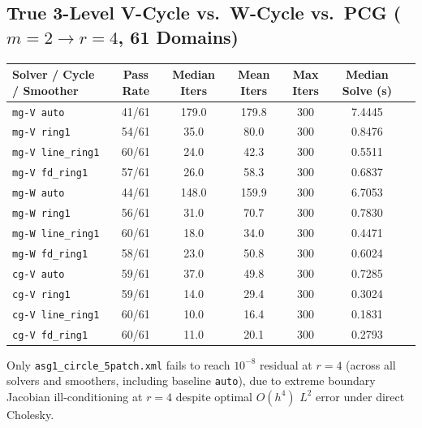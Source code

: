 \documentclass[10pt,a4paper]{article}
\begin{document}
\subsection{True 3-Level V-Cycle vs.\ W-Cycle vs.\ PCG ($m=2\to r=4$, 61 Domains)}
\begin{center}
\small
\begin{tabular}{@{}lcccccc@{}}
\toprule
\textbf{Solver / Cycle / Smoother} & \textbf{Pass Rate} & \textbf{Median Iters} & \textbf{Mean Iters} & \textbf{Max Iters} & \textbf{Median Solve (s)} \\
\midrule
\texttt{mg-V auto} & 41/61 & 179.0 & 179.8 & 300 & 7.4445 \\
\texttt{mg-V ring1} & 54/61 & 35.0 & 80.0 & 300 & 0.8476 \\
\texttt{mg-V line\_ring1} & 60/61 & 24.0 & 42.3 & 300 & 0.5511 \\
\texttt{mg-V fd\_ring1} & 57/61 & 26.0 & 58.3 & 300 & 0.6837 \\
\texttt{mg-W auto} & 44/61 & 148.0 & 159.9 & 300 & 6.7053 \\
\texttt{mg-W ring1} & 56/61 & 31.0 & 70.7 & 300 & 0.7830 \\
\texttt{mg-W line\_ring1} & 60/61 & 18.0 & 34.0 & 300 & 0.4471 \\
\texttt{mg-W fd\_ring1} & 58/61 & 23.0 & 50.8 & 300 & 0.6024 \\
\texttt{cg-V auto} & 59/61 & 37.0 & 49.8 & 300 & 0.7285 \\
\texttt{cg-V ring1} & 59/61 & 14.0 & 29.4 & 300 & 0.3024 \\
\texttt{cg-V line\_ring1} & 60/61 & 10.0 & 16.4 & 300 & 0.1831 \\
\texttt{cg-V fd\_ring1} & 60/61 & 11.0 & 20.1 & 300 & 0.2793 \\
\bottomrule
\end{tabular}
\end{center}
Only \texttt{asg1\_circle\_5patch.xml} fails to reach $10^{-8}$ residual at $r=4$ (across all solvers and smoothers, including baseline \texttt{auto}), due to extreme boundary Jacobian ill-conditioning at $r=4$ despite optimal $O(h^4)$ $L^2$ error under direct Cholesky.
\end{document}
